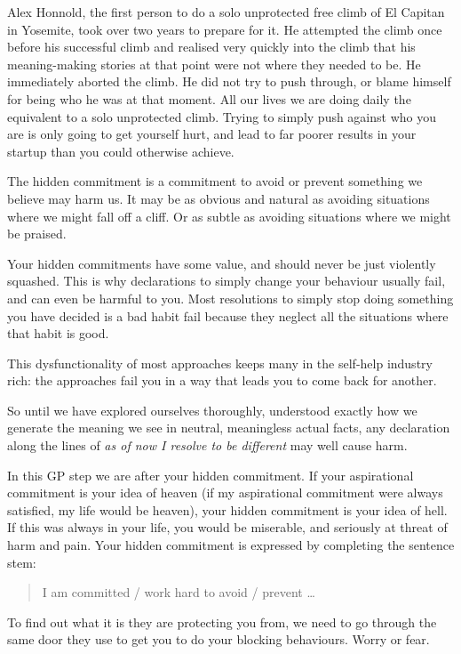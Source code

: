 Alex Honnold\cite{honnold-el-cap}, the first person to do a solo unprotected free climb of El Capitan in Yosemite, took over two years to prepare for it. He attempted the climb once before his successful climb and realised very quickly into the climb that his meaning-making stories at that point were not where they needed to be. He immediately aborted the climb. He did not try to push through, or blame himself for being who he was at that moment. All our lives we are doing daily the equivalent to a solo unprotected climb. Trying to simply push against who you are is only going to get yourself hurt, and lead to far poorer results in your startup than you could otherwise achieve.


The hidden commitment is a commitment to avoid or prevent something we believe may harm us. It may be as obvious and natural as avoiding situations where we might fall off a cliff. Or as subtle as avoiding situations where we might be praised. 


Your hidden commitments have some value, and should never be just violently squashed. 
This is why declarations to simply change your behaviour usually fail, and can even be harmful to you. Most resolutions to simply stop doing something you have decided is a bad habit fail because they neglect all the situations where that habit is good.


This dysfunctionality of most approaches keeps many in the self-help industry rich: the approaches fail you in a way that leads you to come back for another.


So until we have explored ourselves thoroughly, understood exactly how we generate the meaning we see in neutral, meaningless actual facts, any declaration along the lines of \emph{as of now I resolve to be different} may well cause harm. 


In this GP step we are after your hidden commitment. If your aspirational commitment is your idea of heaven (if my aspirational commitment were always satisfied, my life would be heaven), your hidden commitment is your idea of hell. If this was always in your life, you would be miserable, and seriously at threat of harm and pain. Your hidden commitment is expressed by completing the sentence stem: 


\begin{quote} 
I am committed / work hard to avoid / prevent \ldots 
\end{quote}




To find out what it is they are protecting you from, we need to go through the same door they use to get you to do your blocking behaviours. Worry or fear. 
